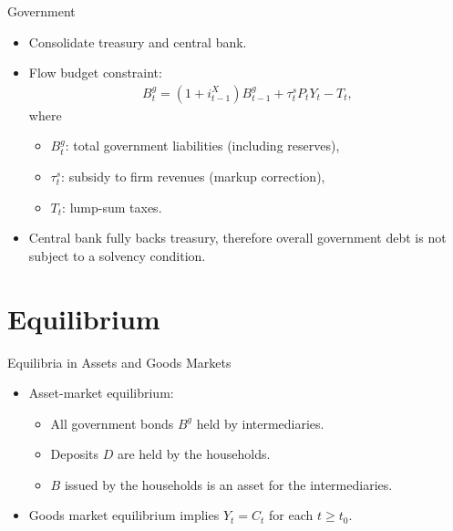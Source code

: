 \documentclass[11pt,aspectratio=169]{beamer}
\begin{document}
\begin{frame}{Government}
  \begin{itemize}
    \item Consolidate treasury and central bank.
    \item Flow budget constraint:
    \begin{align}
        B_t^g
      = (1+i_{t-1}^X) B_{t-1}^g
        + \tau_t^s P_t Y_t
        - T_t, \label{8.10}
    \end{align}
    where
    \begin{itemize}
      \item $B_t^g$: total government liabilities (including reserves),
      \item $\tau_t^s$: subsidy to firm revenues (markup correction),
      \item $T_t$: lump-sum taxes.
    \end{itemize}
    \medskip
    \item Central bank fully backs treasury, therefore overall government debt is not subject to a solvency condition. 
  \end{itemize}
\end{frame}

\section{Equilibrium}


\begin{frame}{Equilibria in Assets and Goods Markets}
    \begin{itemize}
        \item Asset-market equilibrium: 
        \begin{itemize}
            \item All government bonds $B^g$ held by intermediaries.\item Deposits $D$ are held by the households. 
            \item $B$ issued by the households is an asset for the intermediaries.
        \end{itemize}
        \vspace{0.3cm}
        \item Goods market equilibrium implies $Y_t = C_t$ for each $t \ge t_0.$
    \end{itemize}
\end{frame}
\end{document}
